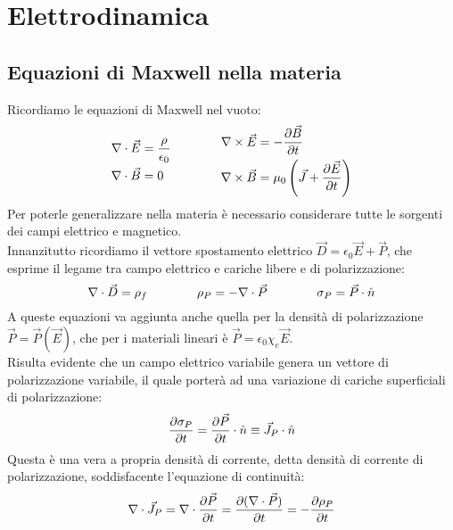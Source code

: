 \section{Elettrodinamica}

\subsection{Equazioni di Maxwell nella materia}

Ricordiamo le equazioni di Maxwell nel vuoto:
\begin{equation}
	\begin{split}
		\nabla\cdot\vec{E} &= \frac{\rho}{\epsilon_0} \\ 
		\nabla\cdot\vec{B} &= 0 
	\end{split}
	\qquad\qquad
	\begin{split}
		\nabla\times\vec{E} &= - \frac{\partial\vec{B}}{\partial t} \\ 
		\nabla\times\vec{B} &= \mu_0 \left( \vec{J} + \frac{\partial\vec{E}}{\partial t} \right)
	\end{split}
	\label{eq:1}
\end{equation}
Per poterle generalizzare nella materia è necessario considerare tutte le sorgenti dei campi elettrico e magnetico. \\ 
%
Innanzitutto ricordiamo il vettore spostamento elettrico $ \vec{D} = \epsilon_0 \vec{E} + \vec{P} $, che esprime il legame tra campo elettrico e cariche libere e di polarizzazione:
\begin{equation}
	\nabla\cdot\vec{D} = \rho_f \qquad\qquad \rho_P = -\nabla\cdot\vec{P} \qquad\qquad \sigma_P = \vec{P}\cdot\hat{n}
	\label{eq:2}
\end{equation}
A queste equazioni va aggiunta anche quella per la densità di polarizzazione $ \vec{P} = \vec{P}(\vec{E}) $, che per i materiali lineari è $ \vec{P} = \epsilon_0 \chi_e \vec{E} $. \\ 
%
Risulta evidente che un campo elettrico variabile genera un vettore di polarizzazione variabile, il quale porterà ad una variazione di cariche superficiali di polarizzazione:
\begin{equation}
	\frac{\partial\sigma_P}{\partial t} = \frac{\partial\vec{P}}{\partial t} \cdot \hat{n} \equiv \vec{J}_P \cdot \hat{n}
	\label{eq:3}
\end{equation}
Questa è una vera a propria densità di corrente, detta densità di corrente di polarizzazione, soddisfacente l'equazione di continuità:
\begin{equation}
	\nabla\cdot\vec{J}_P = \nabla\cdot \frac{\partial\vec{P}}{\partial t} = \frac{\partial (\nabla\cdot\vec{P})}{\partial t} = - \frac{\partial\rho_P}{\partial t}
	\label{eq:4}
\end{equation}
